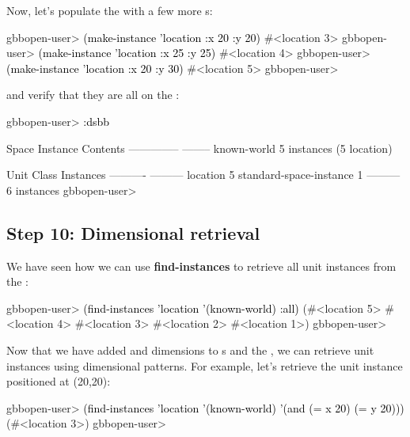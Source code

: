 \documentclass[10pt,twoside,english,pdftex]{article}
\begin{document}
%
%
Now, let's populate the  with a few more s:
%
\W\supp
\begin{example}
\textcolor{darkergray}{%
  gbbopen-user> \textcolor{black}{(make-instance 'location :x 20 :y 20)}
  #<location 3>
  gbbopen-user> \textcolor{black}{(make-instance 'location :x 25 :y 25)}
  #<location 4>
  gbbopen-user> \textcolor{black}{(make-instance 'location :x 20 :y 30)}
  #<location 5>
  gbbopen-user>}
\end{example}
%
and verify that they are all on the :
%
\W\supp\notpretop
\begin{example}
\textcolor{darkergray}{%
  gbbopen-user> \textcolor{black}{:dsbb}
  
  Space Instance                Contents
  --------------                --------
  known-world                   5 instances (5 location)

  Unit Class                    Instances
  ----------                    ---------
  location                              5
  standard-space-instance               1
                                ---------
                                        6 instances
  gbbopen-user>}
\end{example}

\subsection*{Step 10: Dimensional retrieval}

%
%
We have seen how we can use \textbf{find-instances} to retrieve all
 unit instances from the :
%
\W\supp
\begin{example}
\textcolor{darkergray}{%
  gbbopen-user> \textcolor{black}{(find-instances 'location '(known-world) :all)}
  (#<location 5> #<location 4> #<location 3> #<location 2> #<location 1>)
  gbbopen-user>}
\end{example}

Now that we have added  and  dimensions to s
and the , we can retrieve  unit instances
using dimensional patterns.  For example, let's retrieve the unit instance
positioned at (20,20):
%
\W\supp
\begin{example}
\textcolor{darkergray}{%
  gbbopen-user> \textcolor{black}{(find-instances 'location '(known-world)
                  '(and (= x 20) (= y 20)))}
   (#<location 3>)
  gbbopen-user>}
\end{example}
\end{document}
